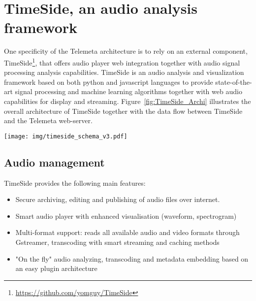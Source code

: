 \documentclass{sig-alternate}
\begin{document}
\section{TimeSide, an audio analysis framework}\label{sec:TimeSide}
One specificity of the Telemeta architecture is to rely on an external component, TimeSide\footnote{\url{https://github.com/yomguy/TimeSide}}, that offers audio player web integration together with audio signal processing analysis capabilities. 
TimeSide is an audio analysis and visualization framework based on both python and javascript languages to provide state-of-the-art signal processing and machine learning algorithms together with web audio capabilities for display and streaming.
Figure~\ref{fig:TimeSide_Archi} illustrates the overall architecture of TimeSide together with the data flow between TimeSide and the Telemeta web-server.
\begin{figure*}[htbp]
  \centering
  \texttt{[image: img/timeside\_schema\_v3.pdf]}
  \caption{TimeSide engine architecture and data flow with Telemeta web-server}\label{fig:TimeSide_Archi}
\end{figure*}
\subsection{Audio management}
TimeSide provides the following main features:
\begin{itemize}
\item Secure archiving, editing and publishing of audio files over
  internet.
\item Smart audio player with enhanced visualisation (waveform, spectrogram)
\item Multi-format support: reads all available audio and video formats  through Gstreamer, transcoding with smart streaming and caching methods%
\item "On the fly" audio analyzing, transcoding and metadata
    embedding based on an easy plugin architecture
\end{itemize}
\end{document}
